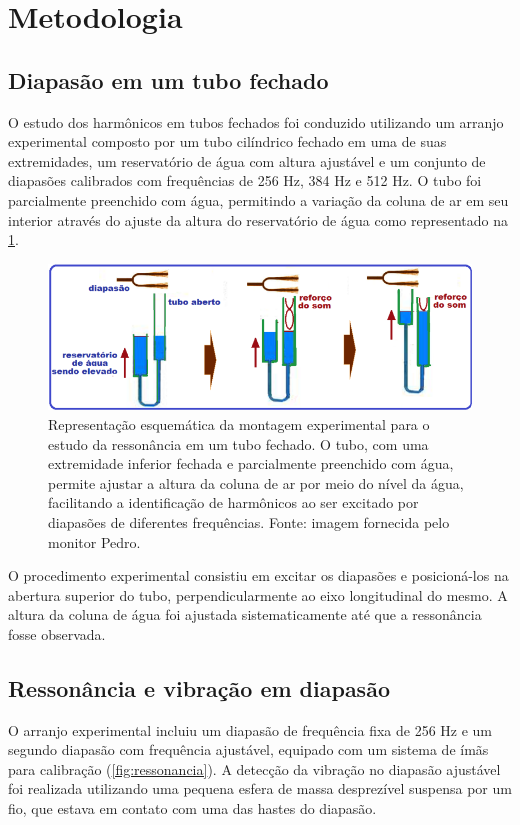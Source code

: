 \section{Metodologia}
\subsection{Diapasão em um tubo fechado}
O estudo dos harmônicos em tubos fechados foi conduzido utilizando um arranjo experimental composto por um tubo cilíndrico fechado em uma de suas extremidades, um reservatório de água com altura ajustável e um conjunto de diapasões calibrados com frequências de 256 Hz, 384 Hz e 512 Hz. O tubo foi parcialmente preenchido com água, permitindo a variação da coluna de ar em seu interior através do ajuste da altura do reservatório de água como representado na \cref{fig:diapasao}.

\begin{figure}[H]
    \centering
    \includegraphics[width=0.35\linewidth]{fig/diapasao.png}
    \caption{Representação esquemática da montagem experimental para o estudo da ressonância em um tubo fechado. O tubo, com uma extremidade inferior fechada e parcialmente preenchido com água, permite ajustar a altura da coluna de ar por meio do nível da água, facilitando a identificação de harmônicos ao ser excitado por diapasões de diferentes frequências. Fonte: imagem fornecida pelo monitor Pedro.}
    \label{fig:diapasao}
\end{figure}

O procedimento experimental consistiu em excitar os diapasões e posicioná-los na abertura superior do tubo, perpendicularmente ao eixo longitudinal do mesmo. A altura da coluna de água foi ajustada sistematicamente até que a ressonância fosse observada.

\subsection{Ressonância e vibração em diapasão}
O arranjo experimental incluiu um diapasão de frequência fixa de 256 Hz e um segundo diapasão com frequência ajustável, equipado com um sistema de ímãs para calibração (\cref{fig:ressonancia}). A detecção da vibração no diapasão ajustável foi realizada utilizando uma pequena esfera de massa desprezível suspensa por um fio, que estava em contato com uma das hastes do diapasão.

